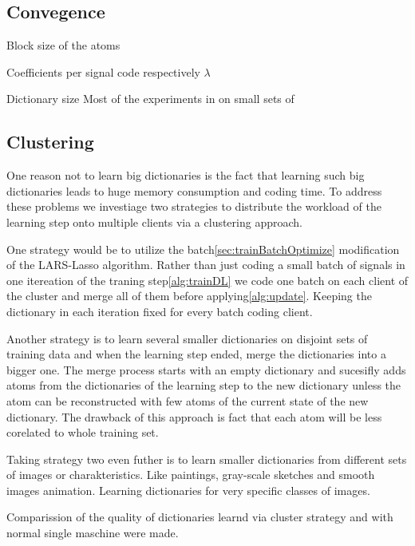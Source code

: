 \subsection{Convegence}

Block size of the atoms

Coefficients per signal code respectively $\lambda$



Dictionary size 
Most of the experiments in on small sets of 

\subsection{Clustering}
One reason not to learn big dictionaries is the fact that learning such big
dictionaries leads to huge memory consumption and coding time.
To address these problems we investiage two strategies to distribute the
workload of the learning step onto multiple clients via a clustering approach.

One strategy would be to utilize the batch\ref{sec:trainBatchOptimize}
modification of the LARS-Lasso algorithm. Rather than just coding a small batch
of signals in one itereation of the traning step\ref{alg:trainDL} we code one
batch on each client of the cluster and merge all of them before
applying\ref{alg:update}. Keeping the dictionary in each iteration fixed
for every batch coding client. 

Another strategy is to learn several smaller dictionaries on disjoint sets of
training data and when the learning step ended, merge the dictionaries
into a bigger one. The merge process starts with an empty dictionary and
sucesifly adds atoms from the dictionaries of the learning step to the
new dictionary unless the atom can be reconstructed with few atoms of the
current state of the new dictionary. The drawback of this approach is fact that 
each atom will be less corelated to whole training set.

Taking strategy two even futher is to learn smaller dictionaries from different
sets of images or charakteristics. Like paintings, gray-scale sketches and
smooth images animation. Learning dictionaries for very specific classes of
images.

Comparission of the quality of dictionaries learnd via cluster strategy and
with normal single maschine were made.


